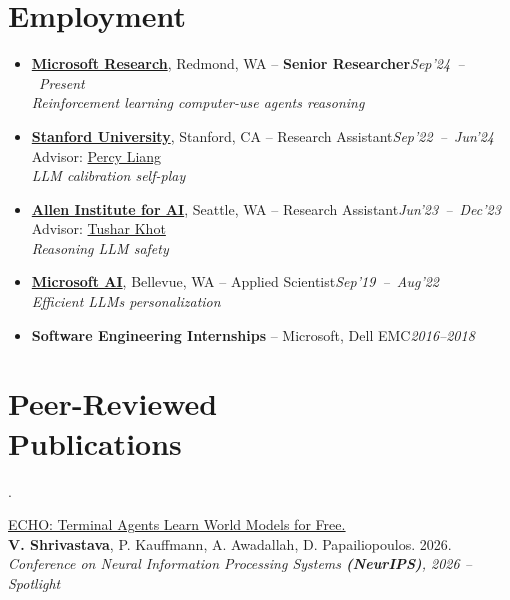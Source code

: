 \documentclass[margin,line]{templates/resume}
\renewcommand{\dates}[1]{\hfill\mbox{\small\itshape #1}}
\newcommand{\linkedpapertitle}[2]{\href{#1}{\uline{#2}}}
\newcommand{\papertitle}[2]{\linkedpapertitle{https://arxiv.org/abs/#1}{#2}}
\newcounter{publication}
\newenvironment{publication}{%
  \addtocounter{publication}{-1}%
  \noindent
  \begin{minipage}[t]{\linewidth}
  \raggedright
  \begin{list}{\ifdefined\unnumberedpublications\else\arabic{publication}.\fi}{%
    \ifdefined\unnumberedpublications
      \setlength{\leftmargin}{0pt}%
      \setlength{\labelwidth}{0pt}%
      \setlength{\labelsep}{0pt}%
    \else
      \setlength{\leftmargin}{10pt}%
      \setlength{\labelwidth}{16pt}%
      \setlength{\labelsep}{5pt}%
    \fi
    \setlength{\topsep}{0pt}%
    \setlength{\parsep}{0pt}%
  }\item\relax
}{\end{list}\end{minipage}\par\addvspace{6pt}}
\begin{document}
\begin{resume}
\section{Employment}
\begin{itemize}
  \item \href{https://www.microsoft.com/en-us/research/}{\textsf{\textbf{Microsoft Research}}}, Redmond, WA -- \textsf{\textbf{Senior Researcher}}\dates{Sep'24 -- Present}\\
    {\small\textit{Reinforcement learning \textperiodcentered{} computer-use agents \textperiodcentered{} reasoning}}
  \item \href{https://cs.stanford.edu/}{\textsf{\textbf{Stanford University}}}, Stanford, CA -- Research Assistant\dates{Sep'22 -- Jun'24}\\
    Advisor: \href{https://cs.stanford.edu/~pliang/}{Percy Liang}\\
    {\small\textit{LLM calibration \textperiodcentered{} self-play}}
  \item \href{https://allenai.org/}{\textsf{\textbf{Allen Institute for AI}}}, Seattle, WA -- Research Assistant\dates{Jun'23 -- Dec'23}\\
    Advisor: \href{https://allenai.org/team/tushark}{Tushar Khot}\\
    {\small\textit{Reasoning \textperiodcentered{} LLM safety}}
  \item \href{https://www.microsoft.com/en-us/research/group/msai/}{\textsf{\textbf{Microsoft AI}}}, Bellevue, WA -- Applied Scientist\dates{Sep'19 -- Aug'22}\\
    {\small\textit{Efficient LLMs \textperiodcentered{} personalization}}
  \item \textsf{\textbf{Software Engineering Internships}} -- Microsoft, Dell EMC\dates{2016--2018}
\end{itemize}

\setcounter{publication}{8}
\section{Peer-Reviewed\\Publications}

\begin{publication}
  \papertitle{2605.24517}{ECHO: Terminal Agents Learn World Models for Free.}\\
  \textbf{V. Shrivastava}, P. Kauffmann, A. Awadallah, D. Papailiopoulos. 2026.\\
  \textit{Conference on Neural Information Processing Systems \textbf{(NeurIPS)}, 2026 -- Spotlight}
\end{publication}


\end{resume}
\end{document}
